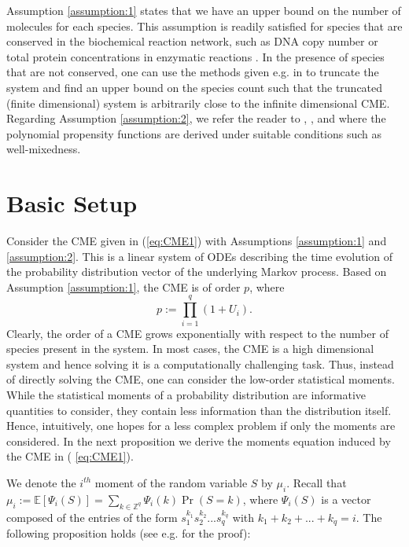 \documentclass[letterpaper, 10 pt, conference]{ieeeconf}
\begin{document}
Assumption \ref{assumption:1} states that we have an upper bound on the
number of molecules for each species. This assumption is readily satisfied
for species that are conserved in the biochemical reaction network, such as
DNA copy number or total protein concentrations in enzymatic reactions \cite%
{del2015biomolecular}. In the presence of species that are not conserved,
one can use the methods given e.g. in \cite{gupta2014scalable} to truncate
the system and find an upper bound on the species count such that the
truncated (finite dimensional) system is arbitrarily close to the infinite
dimensional CME. Regarding Assumption \ref{assumption:2}, we refer the
reader to \cite{gillespie1976general}, \cite{gillespie1992rigorous}, and 
\cite{gillespie2014validity} where the polynomial propensity functions are
derived under suitable conditions such as well-mixedness.

\section{Basic Setup}

Consider the CME given in (\ref{eq:CME1}) with Assumptions \ref{assumption:1}
and \ref{assumption:2}. This is a linear system of ODEs describing the time
evolution of the probability distribution vector of the underlying Markov
process. Based on Assumption \ref{assumption:1}, the CME is of order $p$,
where 
\begin{equation}
p:=\prod\limits_{i=1}^{q} \left( 1+U_{i}\right).  \label{eq:order}
\end{equation}%
Clearly, the order of a CME grows exponentially with respect to the number
of species present in the system. In most cases, the CME is a high
dimensional system and hence solving it is a computationally challenging
task. Thus, instead of directly solving the CME, one can consider the
low-order statistical moments. While the statistical moments of a
probability distribution are informative quantities to consider, they
contain less information than the distribution itself. Hence, intuitively,
one hopes for a less complex problem if only the moments are considered. In
the next proposition we derive the moments equation induced by the CME in (%
\ref{eq:CME1}).

We denote the $i^{th}$ moment of the random variable $S$ by $\mu _{i}$.
Recall that $\mu _{i}:=\mathbb{E}\left[ \Psi _{i}\left( S\right) \right]
=\sum_{k\in \mathbb{Z}^{q}}\Psi _{i}\left( k\right) \Pr \left( S=k\right) $,
where $\Psi _{i}\left( S\right) $ is a vector composed of the entries of the
form $s_{1}^{k_{1}}s_{2}^{k_{2}}...s_{q}^{k_{q}}$ with $%
k_{1}+k_{2}+...+k_{q}=i$. The following proposition holds (see e.g. \cite%
{sotiropoulos2011analytical} for the proof):
\end{document}
